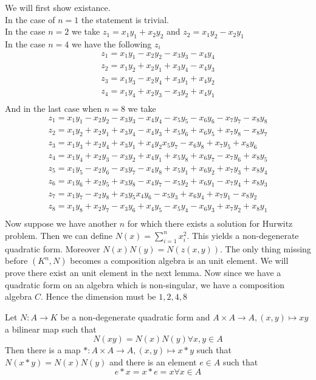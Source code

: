 \documentclass[../Thesis.tex]{subfiles}
\begin{document}
\begin{myproof}
We will first show existance. 
\\In the case of $n = 1$ the statement is trivial. 
\\In the case $n = 2$ we take $z_1 = x_1y_1 + x_2 y_2$ and $z_2 = x_1y_2-x_2y_1$
\\In the case $n = 4$ we have the following $z_i$
\begin{eqnarray}
z_1 = x_1y_1 - x_2y_2 - x_3y_3 - x_4y_4\\
z_2 = x_1y_2 + x_2y_1 + x_3y_4 - x_4y_3\\
z_3 = x_1y_3 - x_2y_4 + x_3y_1 + x_4y_2\\
z_4 = x_1y_4 + x_2y_3 - x_3y_2 + x_4y_1\\
\end{eqnarray}
And in the last case when $n = 8$ we take
\begin{eqnarray}
z_1 = x_1y_1 - x_2 y_2 - x_3y_3 - x_4y_4 - x_5y_5 - x_6y_6 - x_7y_7 - x_8y_8\\
z_2 = x_1y_2 + x_2y_1 + x_3y_4 - x_4y_3 + x_5y_6 + x_6y_5 + x_7y_8 - x_8y_7\\
z_3 = x_1y_3 + x_2 y_4 + x_3y_1 + x_4y_2 x_5y_7 - x_6y_8 + x_7y_5 + x_8y_6\\
z_4 = x_1y_4 + x_2y_3 - x_3y_2 + x_4y_1 + x_5y_8 + x_6y_7 - x_7y_6 + x_8y_5\\
z_5 = x_1y_5 - x_2y_6 - x_3y_7 - x_4y_8 + x_5y_1 + x_6y_2 + x_7y_3 + x_8y_4\\
z_6 = x_1y_6 + x_2y_5 + x_3y_8 - x_4y_7 - x_5y_2 + x_6y_1 - x_7y_4 + x_8y_3\\
z_7 = x_1y_7 -x_2y_8 + x_3y_5 x_4y_6 - x_5y_3 + x_6y_4 + x_7y_1 - x_8y_2\\
z_8 = x_1y_8 + x_2y_7 - x_3y_6 + x_4y_5 - x_5y_4 - x_6y_3 + x_7y_2 + x_8y_1\\
\end{eqnarray}
Now suppose we have another $n$ for which there exists a solution for Hurwitz problem. Then we can define $N(x) = \sum_{i = 1}^n x_i^2$. This yields a non-degenerate quadratic form. Moreover $N(x)N(y) = N(z(x,y))$. The only thing missing before $(K^n, N)$ becomes a composition algebra is an unit element. We will prove there exist an unit element in the next lemma. Now since we have a quadratic form on an algebra which is non-singular, we have a composition algebra $C$. Hence the dimension must be $1,2,4,8$
\end{myproof}
\begin{lemma}
Let $N : A \rightarrow K$ be a non-degenerate quadratic form and $A \times A \rightarrow A, (x,y) \mapsto xy$ a bilinear map such that
\begin{equation}
N(xy) = N(x)N(y) \forall x,y \in A
\end{equation}
Then there is a map $* : A \times A \rightarrow A, (x,y) \mapsto x * y$ such that $N(x*y) = N(x)N(y)$ and there is an element $e \in A$ such that 
\begin{equation}
e*x = x*e = x \forall x \in A
\end{equation}
\end{lemma}
\end{document}
